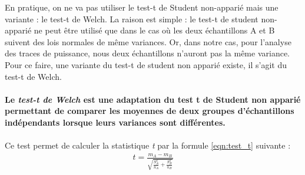 \documentclass[10pt, oneside, a4paper]{article}
\begin{document}
En pratique, on ne va pas utiliser le test-t de Student non-apparié mais une variante : le test-t de Welch. La raison est simple : le test-t de student non-apparié ne peut être utilisé que dans le cas où les deux échantillons A et B suivent des lois normales de même variances. Or, dans notre cas, pour l'analyse des traces de puissance, nous deux échantillons n'auront pas la même variance. Pour ce faire, une variante du test-t de student non apparié existe, il s'agit du test-t de Welch.\\ \\
\textbf{Le \textit{test-t de Welch} est une adaptation du test t de Student non apparié permettant de comparer les moyennes de deux groupes d’échantillons indépendants lorsque leurs variances sont différentes.} \\ \\
Ce test permet de calculer la statistique \textit{t} par la formule \ref{eqn:test_t} suivante :
\begin{gather}
	t=\frac{m_{A} - m_{B}}{\sqrt{\frac{S_{A}^2}{n_{A}} +\frac{S_{B}^2}{n_{B}}}}\label{eqn:test_t}
\end{gather}
\end{document}
